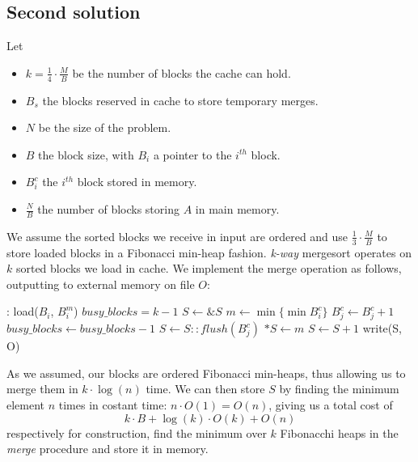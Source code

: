 \subsection{Second solution}
Let
    \begin{itemize}
    \item $k = \frac{1}{4}\cdot \frac{M}{B}$ be the number of blocks the cache can hold.
    \item $B_s$ the blocks reserved in cache to store temporary merges.
    \item $N$ be the size of the problem.
    \item $B$ the block size, with $B_i$ a pointer to the $i^{th}$ block.
    \item $B_{i}^{c}$ the $i^{th}$ block stored in memory.
    \item $\frac{N}{B}$ the number of blocks storing $A$ in main memory.
    \end{itemize}
We assume the sorted blocks we receive in input are ordered and use $\frac{1}{3} \cdot \frac{M}{B}$ to store loaded blocks in a Fibonacci min-heap fashion.
\emph{k-way} mergesort operates on $k$ sorted blocks we load in cache.
We implement the merge operation as follows, outputting to external memory on file $O$:
    \begin{algorithmic}[1]
    :
        \State load($B_i$, $B_i^m$)\;           
    \EndFor
    \State $busy\_blocks = k - 1$\;             
    \State $S \gets \&S$\;                      
        \State $m \gets \min\{\min{B_i^c}\}$\;  
        \State $B_j^c \gets B_j^c + 1$\;        
            \State $busy\_blocks \gets busy\_blocks - 1$\;
        \EndIf
            \State $S \gets S :: flush(B_j^c)$\;    
        \EndIf
        \State $*S \gets m$\;
        \State $S \gets S + 1$\;                
    \EndWhile
    \State write(S, O)\;                        
    \EndFunction
\end{algorithmic}

As we assumed, our blocks are ordered Fibonacci min-heaps, thus allowing us to merge them in $k \cdot \log(n)$ time.
We can then store $S$ by finding the minimum element $n$ times in costant time: $n \cdot O(1) = O(n)$, giving us a total cost of
    \begin{equation*}
    k \cdot B + \log(k) \cdot O(k) + O(n)
    \end{equation*}
respectively for construction, find the minimum over $k$ Fibonacchi heaps in the \emph{merge} procedure and store it in memory.
